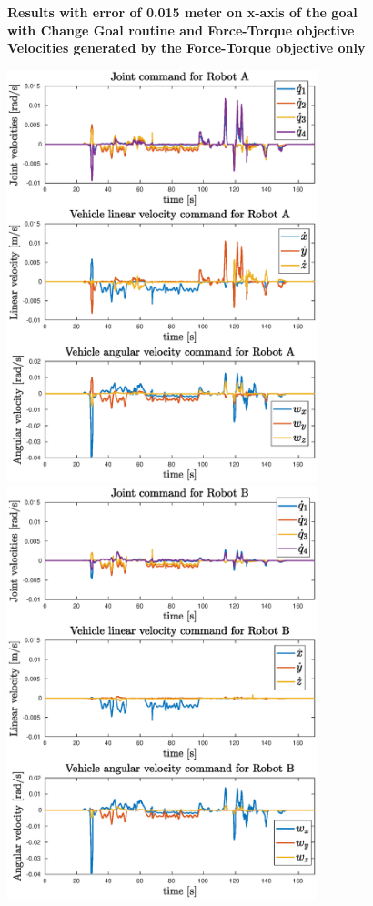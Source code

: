 \begin{figure}[H]
	\centering
	\textbf{Results with error of 0.015 meter on x-axis of the goal}\\
	\textbf{with Change Goal routine and Force-Torque objective}\\
	\vspace{15px}
	\textbf{Velocities generated by the Force-Torque objective only\\}
	\vspace{5px}
	\centerline{ 
		\includegraphics[width=9cm]{error_all/velocityForceTaskA.eps}
		\includegraphics[width=9cm]{error_all/velocityForceTaskB.eps}
	}
	

\end{figure}
